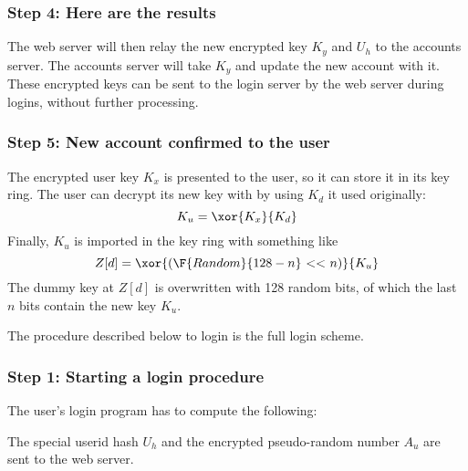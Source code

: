 \subsubsection{Step 4: Here are the results}
\label{sec:apply_step4}
The web server will then relay the new encrypted key $K_y$ and $U_h$ to the accounts server.
The accounts server will take $K_y$
and update the new account with it.
These encrypted keys can be sent to the login server by the web server during logins,
without further processing.

\subsubsection{Step 5: New account confirmed to the user}
\label{sec:apply_step5}
The encrypted user key $K_x$ is presented to the user,
so it can store it in its key ring.
The user can decrypt its new key with by using $K_d$ it used originally:
\[K_u=\xor{K_x}{K_d}\]
Finally, $K_u$ is imported in the key ring with something like
\[Z[d]=\xor{(\F{Random}{128-n}\ \mathbf{<<}\ n)}{K_u}\]
The dummy key at $Z[d]$ is overwritten with 128 random bits,
of which the last $n$ bits contain the new key $K_u$.

\label{sec:full_login}
The procedure described below to login is the full login scheme.

\subsubsection{Step 1: Starting a login procedure}
\label{sec:login_step1}
The user's login program has to compute the following:
The special userid hash $U_h$ and the encrypted pseudo-random number $A_u$ are sent to the web server.

